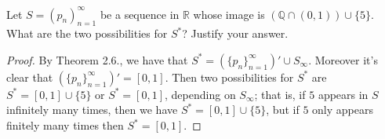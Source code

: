 \documentclass[10pt,reqno]{amsart}
\theoremstyle{definition}
\newcommand{\rr}{\mathbb R}
\newcommand{\qq}{\mathbb Q}
\begin{document}
\begin{tcolorbox}[colback=black!5!white,colframe=black!75!black,title= Chapter 4: Exercise $2.1.$] Let $S = (p_n)_{n=1}^\infty$ be a sequence in $\rr$ whose image is $(\qq \cap (0,1)) \cup \{ 5 \}$. What are
the two possibilities for $S^\ast$? Justify your answer.
\tcblower 
\begin{proof} By Theorem 2.6., we have that $S^\ast = (\{p_n \}_{n=1}^\infty )' \cup S_\infty$. Moreover it's clear that $(\{p_n \}_{n=1}^\infty )' = [0,1]$. Then two possibilities for $S^\ast$ are $S^\ast = [0,1] \cup \{ 5 \} $ or $S^\ast = [0,1]$, depending on $S_\infty$; that is, if $5$ appears in $S$ infinitely many times, then we have $S^\ast = [0,1] \cup \{ 5 \}$, but if $5$ only appears finitely many times then $S^\ast = [0,1]$.
\end{proof}

\end{tcolorbox}
\end{document}
